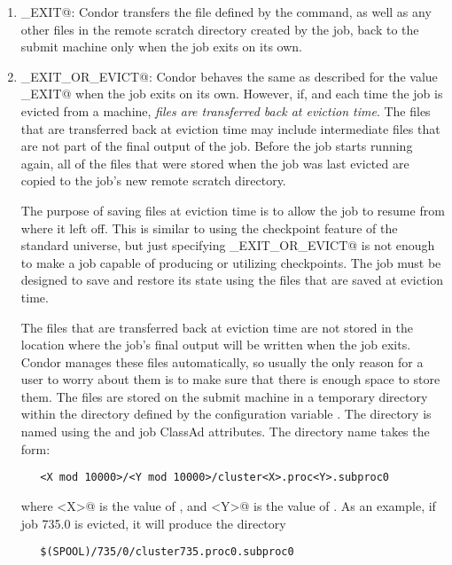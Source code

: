 \begin{enumerate}
\item \verb@ON_EXIT@: Condor transfers the file defined by the
 command,
 as well as any other files in the remote scratch directory created by the job,
back to the submit machine only when the job exits on its own.

\item \verb@ON_EXIT_OR_EVICT@: Condor behaves the same as described
for the value \verb@ON_EXIT@ when the job exits on its own.
However, if, and each time the job is evicted from a machine,
\emph{files are transferred back at eviction time}.  The files that
are transferred back at eviction time may include intermediate files
that are not part of the final output of the job.  Before the job
starts running again, all of the files that were stored when the job
was last evicted are copied to the job's new remote scratch
directory.

The purpose of saving files at eviction time is to allow the job to
resume from where it left off.
This is similar to using the checkpoint feature of the standard universe,
but just specifying \verb@ON_EXIT_OR_EVICT@ is not enough to make a job 
capable of producing or utilizing checkpoints.
The job must be designed to save and restore its state
using the files that are saved at eviction time.

The files that are transferred back at eviction time are not stored in
the location where the job's final output will be written when the job exits.
Condor manages these files automatically,
so usually the only reason for a user to worry about them 
is to make sure that there is enough space to store them.
The files are stored on the submit machine in a temporary directory within the
directory defined by the configuration variable . 
The directory is named using the  and  job
ClassAd attributes.  The directory name takes the form:
\begin{verbatim}
   <X mod 10000>/<Y mod 10000>/cluster<X>.proc<Y>.subproc0
\end{verbatim}
where \verb@<X>@ is the value of , and 
\verb@<Y>@ is the value of . 
As an example, if job 735.0 is evicted, it will produce the directory
\begin{verbatim}
   $(SPOOL)/735/0/cluster735.proc0.subproc0
\end{verbatim}

\end{enumerate}

